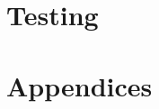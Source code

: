 \documentclass[11pt,a4paper]{report}
\theoremstyle{definitionstyle}
\begin{document}
\chapter{Testing}


\newpage
\appendix
\chapter*{Appendices}
\end{document}
